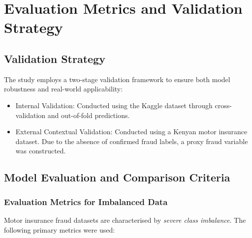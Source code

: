 \documentclass[12pt,a4paper,oneside]{report}
\numberwithin{equation}{chapter}
\begin{document}
\section{Evaluation Metrics and Validation Strategy}

\subsection{Validation Strategy}

The study employs a two-stage validation framework to ensure both model robustness and real-world
applicability:
\begin{itemize}
    \item Internal Validation: Conducted using the Kaggle dataset through cross-validation and out-of-fold predictions.
    \item External Contextual Validation: Conducted using a Kenyan motor insurance dataset. Due to the absence of confirmed fraud labels, a proxy fraud variable was constructed.
\end{itemize}

\subsection{Model Evaluation and Comparison Criteria}
\label{sec:evaluation}

\subsubsection{Evaluation Metrics for Imbalanced Data}

Motor insurance fraud datasets are characterised by \textit{severe class imbalance}. The following
primary metrics were used:
\end{document}
